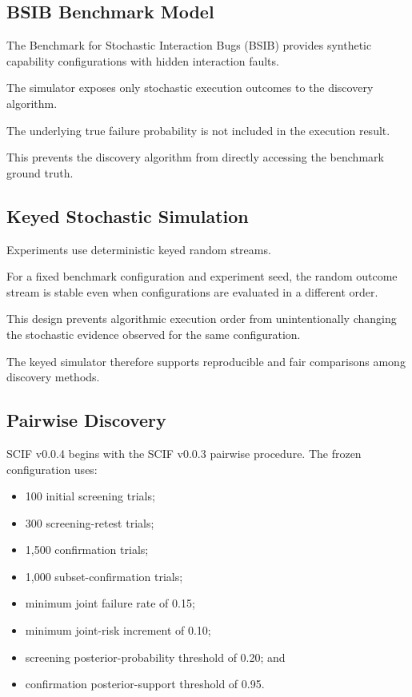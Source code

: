 \subsection{BSIB Benchmark Model}

The Benchmark for Stochastic Interaction Bugs (BSIB) provides synthetic capability configurations with hidden interaction faults.

The simulator exposes only stochastic execution outcomes to the discovery algorithm.

The underlying true failure probability is not included in the execution result.

This prevents the discovery algorithm from directly accessing the benchmark ground truth.

\subsection{Keyed Stochastic Simulation}

Experiments use deterministic keyed random streams.

For a fixed benchmark configuration and experiment seed, the random outcome stream is stable even when configurations are evaluated in a different order.

This design prevents algorithmic execution order from unintentionally changing the stochastic evidence observed for the same configuration.

The keyed simulator therefore supports reproducible and fair comparisons among discovery methods.

\subsection{Pairwise Discovery}

SCIF v0.0.4 begins with the SCIF v0.0.3 pairwise procedure. The frozen configuration uses:

\begin{itemize}
\tightlist
\item
  100 initial screening trials;
\item
  300 screening-retest trials;
\item
  1,500 confirmation trials;
\item
  1,000 subset-confirmation trials;
\item
  minimum joint failure rate of 0.15;
\item
  minimum joint-risk increment of 0.10;
\item
  screening posterior-probability threshold of 0.20; and
\item
  confirmation posterior-support threshold of 0.95.
\end{itemize}

